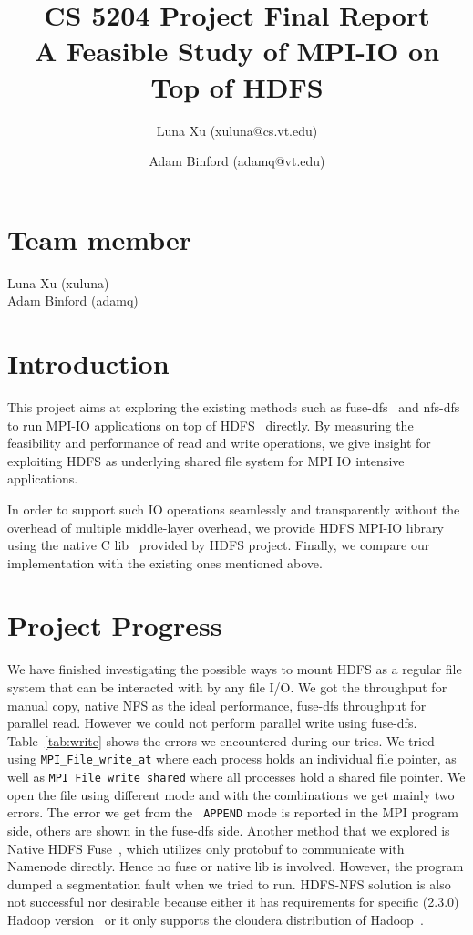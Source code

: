 \documentclass[11pt,titlepage]{article}
\author{Luna Xu (xuluna@cs.vt.edu) \and Adam Binford (adamq@vt.edu)}
\title{CS 5204 Project Final Report \\ A Feasible Study of MPI-IO on Top of HDFS}
\begin{document}
\maketitle

\section{Team member}
Luna Xu (xuluna)\\
Adam Binford (adamq)

\section{Introduction}
This project aims at exploring the existing methods such as
fuse-dfs~\cite{fuse} and nfs-dfs~\cite{nfs} to run MPI-IO applications on top of
HDFS~\cite{hdfs} directly. By measuring the feasibility and performance of read and write
operations, we give insight for exploiting HDFS as underlying shared file system
for MPI IO intensive applications.

In order to support such IO operations seamlessly and transparently without the
overhead of multiple middle-layer overhead, we provide HDFS MPI-IO library using
the native C lib~\cite{lib} provided by HDFS project. Finally, we compare our
implementation with the existing ones mentioned above.

\section{Project Progress}
We have finished investigating the possible ways to mount HDFS as a regular
file system that can be interacted with by any file I/O. 
We got the throughput for manual copy, native NFS as the ideal performance,
fuse-dfs throughput for parallel read. However we could not perform parallel
write using fuse-dfs. Table~\ref{tab:write} shows the errors we encountered during our
tries. We tried using {\tt MPI\_File\_write\_at} where each process holds an
individual file pointer, as well as {\tt MPI\_File\_write\_shared} where all
processes hold a shared file pointer. We open the file using different mode and
with the combinations we get mainly two errors. The error we get from the {\tt
APPEND} mode is reported in the MPI program side, others are shown in the
fuse-dfs side. Another method that we explored is Native HDFS Fuse~\cite{native},
which utilizes only protobuf to communicate with Namenode directly. Hence no
fuse or native lib is involved. However, the program dumped a segmentation fault
when we tried to run. HDFS-NFS solution is also not successful nor
desirable because either it has requirements for specific (2.3.0) Hadoop
version~\cite{nfs} or it only supports the cloudera distribution of
Hadoop~\cite{proxy}.
\end{document}

